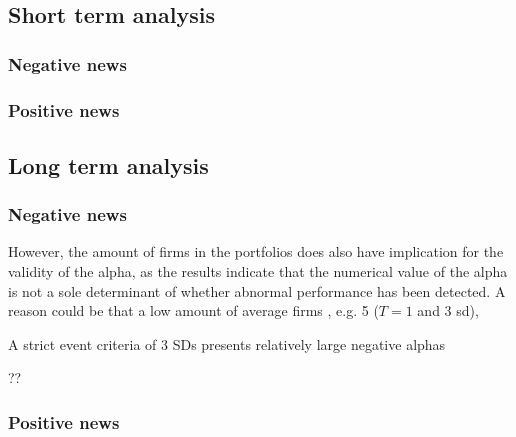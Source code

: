 \subsection{Short term analysis}

\subsubsection{Negative news}

\subsubsection{Positive news}

\subsection{Long term analysis}



\subsubsection{Negative news}


  However, the amount of firms in the portfolios does also have implication for the validity of the alpha, as the results indicate that the numerical value of the alpha is not a sole determinant of whether abnormal performance has been detected. A reason could be that a low amount of average firms , e.g. 5 ($T = 1$ and 3 sd), 

A strict event criteria of 3 SDs presents relatively large negative alphas

  ??

  \subsubsection{Positive news}




